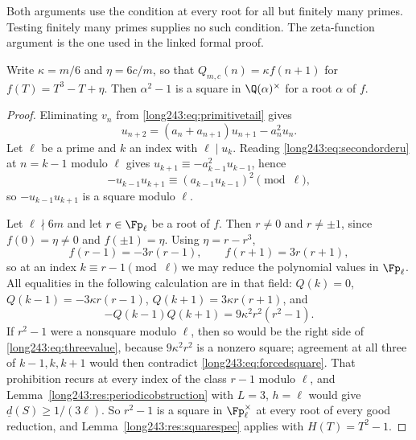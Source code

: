 Both arguments use the condition at every root for all but finitely
many primes. Testing finitely many primes supplies no such condition.
The zeta-function argument is the one used in the linked formal proof.

\begin{proposition}\label{long243:res:transportsquare}
Write $\kappa=m/6$ and $\eta=6c/m$, so that $Q_{m,c}(n)=\kappa f(n+1)$ for
$f(T)=T^3-T+\eta$.  Then $\alpha^2-1$ is a square in $\Q(\alpha)^\times$ for a
root $\alpha$ of $f$.
\end{proposition}

\begin{proof}
Eliminating $v_n$ from \eqref{long243:eq:primitivetail} gives
\begin{equation}\label{long243:eq:secondorderu}
 u_{n+2}=(a_n+a_{n+1})u_{n+1}-a_n^2u_n .
\end{equation}
Let $\ell$ be a prime and $k$ an index with $\ell\mid u_k$.  Reading
\eqref{long243:eq:secondorderu} at $n=k-1$ modulo $\ell$ gives
$u_{k+1}\equiv-a_{k-1}^2u_{k-1}$, hence
\begin{equation}\label{long243:eq:forcedsquare}
 -u_{k-1}u_{k+1}\equiv(a_{k-1}u_{k-1})^2 \pmod\ell,
\end{equation}
so $-u_{k-1}u_{k+1}$ is a square modulo $\ell$.

Let $\ell\nmid6m$ and let $r\in\Fp_\ell$ be a root of $f$.  Then $r\ne0$ and
$r\ne\pm1$, since $f(0)=\eta\ne0$ and $f(\pm1)=\eta$.  Using $\eta=r-r^3$,
\[
 f(r-1)=-3r(r-1),\qquad f(r+1)=3r(r+1),
\]
so at an index $k\equiv r-1\pmod\ell$ we may reduce the polynomial values in
$\Fp_\ell$. All equalities in the following calculation are in that field:
$Q(k)=0$, $Q(k-1)=-3\kappa r(r-1)$, $Q(k+1)=3\kappa r(r+1)$, and
\begin{equation}\label{long243:eq:threevalue}
 -Q(k-1)Q(k+1)=9\kappa^2r^2(r^2-1).
\end{equation}
If $r^2-1$ were a nonsquare modulo $\ell$, then so would be the right side of
\eqref{long243:eq:threevalue}, because $9\kappa^2r^2$ is a nonzero square; agreement at
all three of $k-1,k,k+1$ would then contradict \eqref{long243:eq:forcedsquare}.  That
prohibition recurs at every index of the class $r-1$ modulo $\ell$, and
Lemma~\ref{long243:res:periodicobstruction} with $L=3$, $h=\ell$ would give
$\underline d(S)\ge1/(3\ell)$.  So $r^2-1$ is a square in $\Fp_\ell^\times$ at
every root of every good reduction, and Lemma~\ref{long243:res:squarespec} applies with
$H(T)=T^2-1$.
\end{proof}

